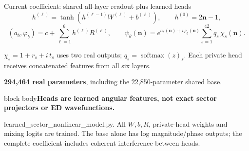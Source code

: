 \documentclass[aspectratio=169,10pt]{beamer}
\newcommand{\src}[1]{\vfill{\fontsize{6.3}{7.5}\selectfont\color{muted}#1\par}}
\newcommand{\take}[1]{\vspace{1mm}\begin{beamercolorbox}[sep=1.6mm,wd=\textwidth]{block body}\small\color{teal}\textbf{#1}\end{beamercolorbox}}
\newcommand{\nn}{\mathbf n}
\begin{document}
\begin{frame}{Current coefficient: shared all-layer readout plus learned heads}
\[
h^{(\ell)}=\tanh(h^{(\ell-1)}W^{(\ell)}+b^{(\ell)}),\qquad h^{(0)}=2\nn-1,
\]
\[
(a_b,\varphi_b)=c+\sum_{\ell=1}^{6}h^{(\ell)}R^{(\ell)},\qquad
\boxed{\psi_\theta(\nn)=e^{a_b(\nn)+i\varphi_b(\nn)}
\sum_{s=1}^{42}q_s\,\chi_s(\nn)}.
\]
\begin{center}
\end{center}
\small
$\chi_s=1+r_s+i\,t_s$ uses two real outputs; $q_s=\operatorname{softmax}(z)_s$.
Each private head receives concatenated features from all six layers.\par\medskip
\textbf{294,464 real parameters}, including the 22,850-parameter shared base.
\take{Heads are learned angular features, not exact sector projectors or ED wavefunctions.}
\src{learned\_sector\_nonlinear\_model.py. All $W,b,R$, private-head weights and mixing logits are trained. The base alone has log magnitude/phase outputs; the complete coefficient includes coherent interference between heads.}
\end{frame}
\end{document}
